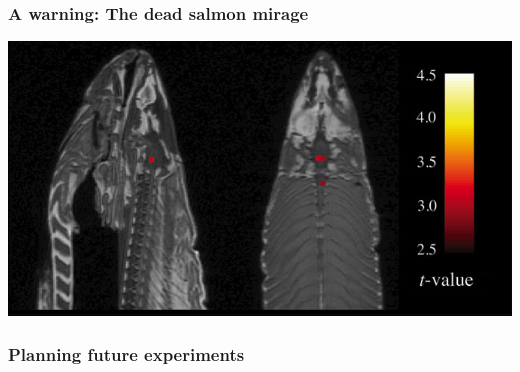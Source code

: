 \documentclass{beamer}
\newcommand{\pnote}[1] {}
\begin{document}

\begin{frame}
  \frametitle{A warning: The dead salmon mirage}
  \includegraphics[width=\textwidth]{figures/fmri-salmon}
\end{frame}
\pnote{ It is quite easy to draw the wrong conclusions from
  applying machine learning / statistics to your data. For example, it
  was fashionable to perform fMRI studies in humans to see whether
  some neurons have a particular functional role. So some scientists
  tried to replicate those results. They took a dead salmon, and put
  it an fMRI scanner. They checked its brain activity when it was
  shown images of happy or sad people. Perhaps surprisingly, they
  found an area of the brain that was correlated with the pictures -
  so it seemed, as though the dead salmon could distinguish photos of
  happy people from sad ones. However, this was all due to a
  misapplication of statistics. In this course, we will try and teach
  you to avoid such mistakes.  }


\begin{frame}
  \frametitle{Planning future experiments}
  \centering
\end{frame}
\end{document}
